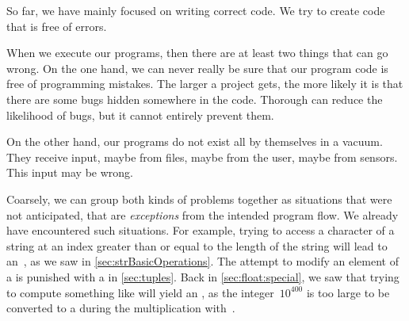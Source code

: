%
\label{sec:exceptions}%
%
So far, we have mainly focused on writing correct code.
We try to create code that is free of errors.

When we execute our programs, then there are at least two things that can go wrong.
On the one hand, we can never really be sure that our program code is free of programming mistakes.
The larger a project gets, the more likely it is that there are some bugs hidden somewhere in the code.
Thorough  can reduce the likelihood of bugs, but it cannot entirely prevent them.

On the other hand, our programs do not exist all by themselves in a vacuum.
They receive input, maybe from files, maybe from the user, maybe from sensors.
This input may be wrong.

Coarsely, we can group both kinds of problems together as situations that were not anticipated, that are \emph{exceptions} from the intended program flow.
We already have encountered such situations.
For example, trying to access a character of a string at an index greater than or equal to the length of the string will lead to an~, as we saw in \cref{sec:strBasicOperations}.
The attempt to modify an element of a  is punished with a  in \cref{sec:tuples}.
Back in \cref{sec:float:special}, we saw that trying to compute something like  will yield an , as the integer~$10^{400}$ is too large to be converted to a  during the multiplication with~.

